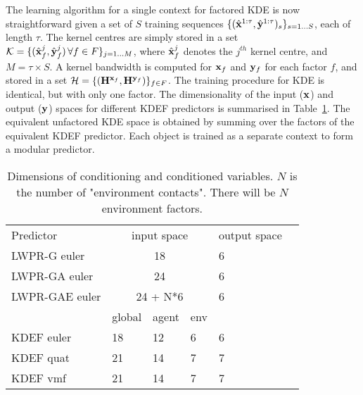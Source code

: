
The learning algorithm for a single context for factored KDE is now straightforward given a set of $S$ training sequences $\{ (\hat{\mathbf{x}}^{1:\tau} , \hat{\mathbf{y}}^{1:\tau})_s \}_{s = 1 \ldots S}$, each of length $\tau$. The kernel centres are simply stored in a set $\mathcal{K} = \{ ( \hat{\mathbf{x}}^j_f ,  \hat{\mathbf{y}}^j_f ) \, \forall f \in F \}_{ j = 1 \ldots M}$, where $\hat{\mathbf{x}}^j_f$ denotes the $j^{th}$ kernel centre, and $M= \tau \times S$. A kernel bandwidth is computed for $\mathbf{x}_f$ and $\mathbf{y}_f$ for each factor $f$, and stored in a set $\mathcal{H} = \{ (\mathbf{H}^{\mathbf{x}_f},  \mathbf{H}^{\mathbf{y}_f} ) \}_{f \in F}$. The training procedure for KDE is identical, but with only one factor. The dimensionality of the input ($\mathbf{x}$) and output ($\mathbf{y}$) spaces for different KDEF predictors is summarised in Table~\ref{tab:InpOutSpace}. The equivalent unfactored KDE space is obtained by summing over the factors of the equivalent KDEF predictor. Each object is trained as a separate context to form a modular predictor.

\begin{table}[b]
\begin{center}
\begin{tabular}{|l|l|l|l|l|l|}
\cline{1-5}
Predictor & \multicolumn{3}{|c|}{input space } & output space \\
\cline{1-5}
LWPR-G euler & \multicolumn{3}{|c|}{18} & 6 \\
LWPR-GA euler & \multicolumn{3}{|c|}{24} & 6 \\
LWPR-GAE euler & \multicolumn{3}{|c|}{24 + N*6} & 6 \\
\cline{1-5}
\cline{2-4}
 & global & agent & env & \\
\cline{1-5}
KDEF euler & 18 & 12 & 6 & 6 \\
KDEF quat & 21 & 14 & 7 & 7 \\
KDEF vmf & 21 & 14 & 7 & 7 \\
\cline{1-5}
\end{tabular}
\end{center}
\caption[Input/output space]{Dimensions of conditioning and conditioned variables. $N$ is the number of
"environment contacts". There will be $N$ environment factors.}\label{tab:InpOutSpace}
\end{table}


